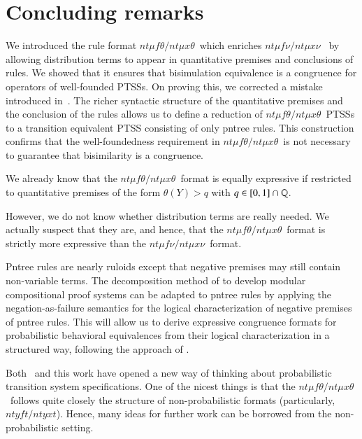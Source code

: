 \documentclass[submission,copyright,creativecommons]{eptcs}
\newcommand{\gtgeq}{\trianglerighteq}
\newcommand{\ntmufnu}{\ensuremath{\textit{nt}\mu\textit{f}\nu}}
\newcommand{\ntmuxnu}{\ensuremath{\textit{nt}\mu\textit{x}\nu}}
\newcommand{\ntmufxnu}{\ensuremath{\ntmufnu\textit{/}\ntmuxnu}}
\newcommand{\ntmuft}{\ensuremath{\textit{nt}\mu\textit{f}\theta}}
\newcommand{\ntmuxt}{\ensuremath{\textit{nt}\mu\textit{x}\theta}}
\newcommand{\ntmufxt}{\ensuremath{\ntmuft\textit{/}\ntmuxt}}
\newcommand{\ntyft}{\ensuremath{\textit{ntyft}}}
\newcommand{\ntyxt}{\ensuremath{\textit{ntyxt}}}
\newcommand{\ntyfxt}{\ensuremath{\ntyft\textit{/}\ntyxt}}
\newcommand{\colorpar}[3]{\colorbox{#1}{\parbox{#2}{#3}}}
\newcommand{\marginremark}[3]{\marginpar{\colorpar{#2}{\linewidth}{\color{#1}#3}}}
\newcommand{\remarkPRD}[1]{\marginremark{darkred}{lightred}{\tiny{[PRD]~ #1}}}
\newcommand{\remarkDG}[1]{\marginremark{darkgreen}{lightyellow}{\tiny{[DG]~ #1}}}
\renewcommand{\remarkDG}[1]{}
\renewcommand{\remarkPRD}[1]{}
\begin{document}
\section{Concluding remarks}


We introduced the rule format \ntmufxt\ which enriches
\ntmufxnu~\cite{DL-fossacs12} by allowing distribution terms to appear
in quantitative premises and conclusions of rules.
We showed that it ensures that bisimulation equivalence is a
congruence for operators of well-founded PTSSs.  On proving this, we
corrected a mistake introduced in~\cite{DL-fossacs12}.
The richer syntactic structure of the quantitative premises and the
conclusion of the rules allows us to define a reduction of
\ntmufxt\ PTSSs to a transition equivalent PTSS consisting of only
pntree rules.
This construction confirms that the well-foundedness requirement in
\ntmufxt\ is not necessary to guarantee that bisimilarity is a
congruence.



We already know that the \ntmufxt\ format is equally expressive if
restricted to quantitative premises of the form $\theta(Y)> q$ with
$q\in [0,1]\cap\mathbb{Q}$.  
\remarkDG{Do you want to say that without loss of expressivity one can restrict $\gtgeq$ to only $>$ and express $\theta(Y)\ge q$ by $\{{\theta(Y) > q} \mid {q\in \Q \land q < r}\}$ ?}\remarkPRD{Not only that, but also that it suffices that $q$ is a rational number (instead of real). BTW, I corrected $\cup$ by $\cap$.}\remarkDG{Not required for the paper but just for my understanding: What is the reason that $\mathbb Q$ suffices? Is this following Dedikind-cut argumentation?}
\remarkPRD{Yes. For the case of $\theta(Y) > r$, we need to introduce an (denumerably) infinite number of rules. (This remark is also for me to remember how is the encoding.)}
However, we do not know whether distribution
terms are really needed.  We actually suspect that they are, and
hence, that the \ntmufxt\ format is strictly more expressive than the
\ntmufxnu\ format. 


Pntree rules are nearly ruloids \cite{BloomIM95:jacm} except that
negative premises may still contain non-variable terms. The decomposition 
method of \cite{Bloom:2004:PFD:963927.963929,Gebler:2012:phml_lt_sos} to develop
modular compositional proof systems can be adapted to pntree
rules by applying the negation-as-failure semantics for the logical characterization of
negative premises of pntree rules.
This will allow us to derive expressive congruence formats for probabilistic behavioral equivalences from their logical characterization in a structured way, following the approach of \cite{Bloom:2004:PFD:963927.963929}.


Both~\cite{DL-fossacs12} and this work have opened a new way of
thinking about probabilistic transition system specifications.  One of the
nicest things is that the \ntmufxt\ follows quite closely the
structure of non-probabilistic formats (particularly, \ntyfxt).
Hence, many ideas for further work can be borrowed from the
non-probabilistic setting.








\end{document}
